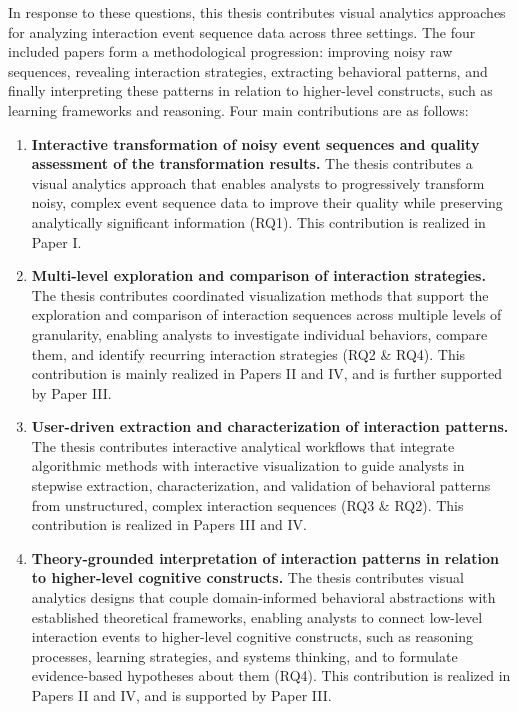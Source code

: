 In response to these questions, this thesis contributes visual analytics approaches for analyzing interaction event sequence data across three settings.
The four included papers form a methodological progression: improving noisy raw sequences, revealing interaction strategies, extracting behavioral patterns, and finally interpreting these patterns in relation to higher-level constructs, such as learning frameworks and reasoning.
Four main contributions are as follows:
\begin{enumerate}
    \renewcommand{\labelenumi}{C\arabic{enumi}.}
    \item 
    \textbf{Interactive transformation of noisy event sequences and quality assessment of the transformation results.}
    The thesis contributes a visual analytics approach that enables analysts to progressively transform noisy, complex event sequence data to improve their quality while preserving analytically significant information (RQ1).
    This contribution is realized in Paper I.

    \item 
    \textbf{Multi-level exploration and comparison of interaction strategies.}
    The thesis contributes coordinated visualization methods that support the exploration and comparison of interaction sequences across multiple levels of granularity, enabling analysts to investigate individual behaviors, compare them, and identify recurring interaction strategies (RQ2 \& RQ4).
    This contribution is mainly realized in Papers II and IV, and is further supported by Paper III.

    \item 
    \textbf{User-driven extraction and characterization of interaction patterns.}
    The thesis contributes interactive analytical workflows that integrate algorithmic methods with interactive visualization to guide analysts in stepwise extraction, characterization, and validation of behavioral patterns from unstructured, complex interaction sequences (RQ3 \& RQ2).
    This contribution is realized in Papers III and IV.
    
    \item 
    \textbf{Theory-grounded interpretation of interaction patterns in relation to higher-level cognitive constructs.}
    The thesis contributes visual analytics designs that couple domain-informed behavioral abstractions with established theoretical frameworks, enabling analysts to connect low-level interaction events to higher-level cognitive constructs, such as reasoning processes, learning strategies, and systems thinking, and to formulate evidence-based hypotheses about them (RQ4).
    This contribution is realized in Papers II and IV, and is supported by Paper III.
\end{enumerate}





